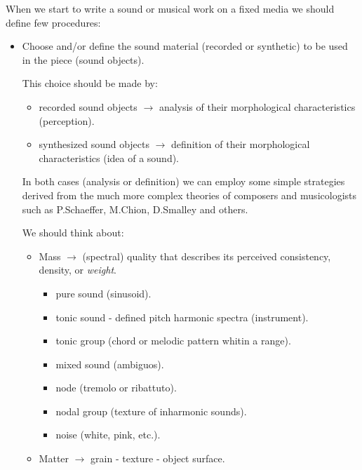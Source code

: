 When we start to write a sound or musical work on a fixed media we should define few procedures:

\begin{itemize}

\item Choose and/or define the sound material (recorded or synthetic) to be used in the piece (sound objects).

  This choice should be made by:

  \begin{itemize}
  \tightlist
  \item recorded sound objects \(\rightarrow\) analysis of their morphological characteristics (perception).
  \item synthesized sound objects \(\rightarrow\) definition of their morphological characteristics (idea of a sound).
  \end{itemize}

  In both cases (analysis or definition) we can employ some simple strategies derived from the much more complex theories of composers and musicologists such as P.Schaeffer, M.Chion, D.Smalley and others.

  We should think about:

  \begin{itemize}
  \item Mass \(\rightarrow\) (spectral) quality that describes its perceived consistency, density, or \textit{weight}.

    \begin{itemize}
    \tightlist
    \item pure sound (sinusoid).
    \item tonic sound - defined pitch harmonic spectra (instrument).
    \item tonic group (chord or melodic pattern whitin a range).
    \item mixed sound (ambiguos).
    \item node (tremolo or ribattuto).
    \item nodal group (texture of inharmonic sounds).
    \item noise (white, pink, etc.).
    \end{itemize}
  \item
    Matter \(\rightarrow\) grain - texture - object surface.


\end{itemize}
\end{itemize}
